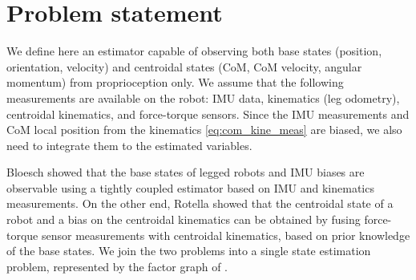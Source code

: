 



\section{Problem statement}

We define here an estimator capable of observing both base states (position, orientation, velocity) and centroidal states (CoM, CoM velocity, angular momentum) from proprioception
only. We assume that the following measurements are available on the robot: IMU data, kinematics (leg odometry), centroidal kinematics, and force-torque sensors. 
Since the IMU measurements  and CoM local position from the kinematics \eqref{eq:com_kine_meas} are biased, we also need to integrate them to the estimated
variables.

Bloesch \cite{bloesch2013state} showed that the base states of legged robots and IMU biases are observable using a tightly coupled estimator based on IMU and kinematics measurements.
On the other end, Rotella \cite{rotella2015humanoid} showed that the centroidal state of a robot and a bias on the centroidal kinematics can be obtained by fusing 
force-torque sensor measurements with centroidal kinematics, based on prior knowledge of the base states. We join the two problems into a single state estimation problem, 
represented by the factor graph of .  

